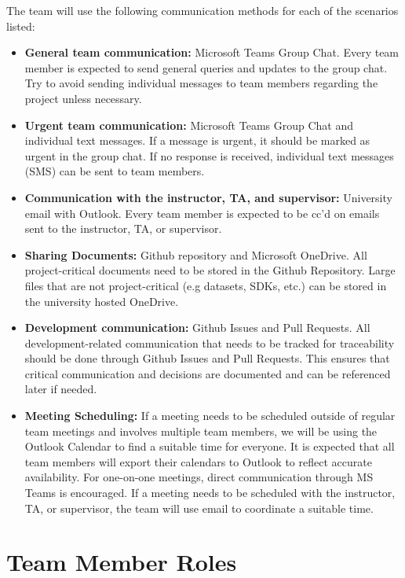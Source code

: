 \documentclass{article}
\begin{document}
The team will use the following communication methods for each of the scenarios
listed:
\begin{itemize}
  \item \textbf{General team communication:} Microsoft Teams Group Chat. Every
  team member is expected to send general queries and updates to the group chat.
  Try to avoid sending individual messages to team members regarding the project
  unless necessary.
  \item \textbf{Urgent team communication:} Microsoft Teams Group Chat and
  individual text messages. If a message is urgent, it should be marked as
  urgent in the group chat. If no response is received, individual text messages
  (SMS) can be sent to team members.
  \item \textbf{Communication with the instructor, TA, and supervisor:}
  University email with Outlook. Every team member is expected to be cc'd on
  emails sent to the instructor, TA, or supervisor.
  \item \textbf{Sharing Documents:} Github repository and Microsoft OneDrive.
  All project-critical documents need to be stored in the Github Repository.
  Large files that are not project-critical (e.g datasets, SDKs, etc.) can be
  stored in the university hosted OneDrive.
  \item \textbf{Development communication:} Github Issues and Pull Requests.
  All development-related communication that needs to be tracked for
  traceability should be done through Github Issues and Pull Requests. This
  ensures that critical communication and decisions are documented and can be
  referenced later if needed.
  \item \textbf{Meeting Scheduling:} If a meeting needs to be scheduled outside
  of regular team meetings and involves multiple team members, we will be using
  the Outlook Calendar to find a suitable time for everyone. It is expected that
  all team members will export their calendars to Outlook to reflect accurate
  availability. For one-on-one meetings, direct communication through MS Teams
  is encouraged. If a meeting needs to be scheduled with the instructor, TA, or
  supervisor, the team will use email to coordinate a suitable time. 
\end{itemize}

\section{Team Member Roles}
\end{document}
